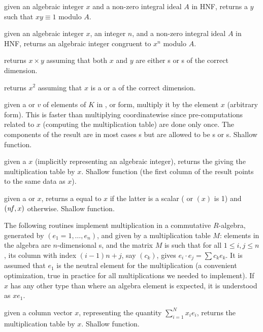  given an algebraic integer
$x$ and a non-zero integral ideal $A$ in HNF, returns a $y$ such that
$xy \equiv 1$ modulo $A$.

 given an algebraic
integer $x$, an integer $n$, and a non-zero integral ideal $A$ in HNF,
returns an algebraic integer congruent to $x^n$ modulo $A$.

 returns $x\times y$ assuming
that both $x$ and $y$ are either s or s of the correct
dimension.

 returns $x^2$ assuming that $x$ is a 
or a  of the correct dimension.

 given a  or 
$v$ of elements of $K$ in ,  or  form, multiply
it by the element $x$ (arbitrary form). This is faster than multiplying
coordinatewise since pre-computations related to $x$ (computing the
multiplication table) are done only once. The components of the result
are in most cases s but are allowed to be s or s.
Shallow function.

 given a  $x$ (implicitly
representing an algebraic integer), returns the  giving the
multiplication table by $x$. Shallow function (the first column of the result
points to the same data as $x$).

 given a  or 
$x$, returns a  equal to $x$ if the latter is a scalar
( or $(x)$ is 1) and
$(\hbox{\it nf\/},x)$ otherwise. Shallow function.


The following routines implement multiplication in a commutative $R$-algebra,
generated by $(e_1 = 1,\dots, e_n)$, and given by a multiplication table $M$:
elements in the algebra are $n$-dimensional s, and the matrix
$M$ is such that for all $1\leq i,j\leq n$, its column with index $(i-1)n +
j$, say $(c_k)$, gives $e_i\cdot e_j = \sum c_k e_k$. It is assumed that
$e_1$ is the neutral element for the multiplication (a convenient
optimization, true in practice for all multiplications we needed to implement).
If $x$ has any other type than  where an algebra element is
expected, it is understood as $x e_1$.

 given a column vector $x$, representing
the quantity $\sum_{i=1}^N x_i e_i$, returns the multiplication table by $x$.
Shallow function.

